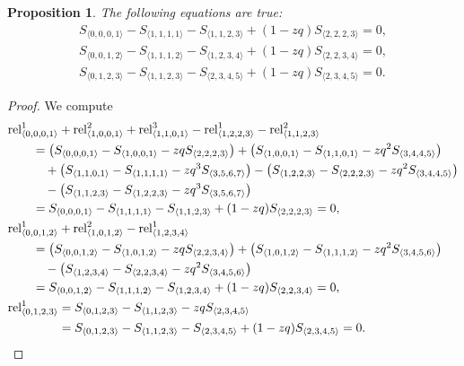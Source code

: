 \documentclass[10pt,a4paper]{amsart}
\numberwithin{equation}{section}
\newtheorem{Proposition}[Theorem]{Proposition}
\theoremstyle{definition}
\newcommand{\rel}{\text{rel}}
\begin{document}
\begin{Proposition}
The following equations are true:
\begin{gather*}
 S_{\langle 0, 0, 0, 1\rangle}- S_{\langle 1, 1, 1, 1\rangle} - S_{\langle 1, 1, 2, 3\rangle} + (1-zq)S_{\langle 2, 2, 2, 3\rangle} =0, \\
 S_{\langle 0, 0, 1,2\rangle}- S_{\langle 1, 1, 1, 2\rangle} - S_{\langle 1, 2,3,4\rangle} + (1-zq)S_{\langle 2, 2, 3, 4\rangle} =0, \\
 S_{\langle 0, 1,2,3\rangle}- S_{\langle 1,1,2,3\rangle} - S_{\langle 2,3,4,5\rangle} + (1-zq)S_{\langle 2, 3,4,5\rangle} =0.
\end{gather*}
\end{Proposition}

\begin{proof}
We compute
\begin{align*}
&\rel^1_{\langle0,0,0,1\rangle}+\rel^2_{\langle 1,0,0,1\rangle}+\rel^3_{\langle 1,1,0,1\rangle}
-\rel^1_{\langle 1,2,2,3\rangle }-\rel^2_{\langle 1,1,2,3\rangle} \\
& \qquad {}=\bigl(S_{\langle 0, 0, 0, 1\rangle} - S_{\langle 1, 0, 0, 1\rangle} -zq S_{\langle 2, 2, 2, 3\rangle}\bigr) + \bigl(S_{\langle 1, 0, 0, 1\rangle} - S_{\langle 1, 1, 0, 1\rangle} -zq^2 S_{\langle 3, 4, 4, 5\rangle}\bigr) \\
& \qquad\quad{} +\bigl( S_{\langle 1, 1, 0, 1\rangle} - S_{\langle 1, 1, 1, 1\rangle} -zq^3 S_{\langle 3, 5, 6, 7\rangle}\bigr) -\bigl(S_{\langle 1, 2, 2, 3\rangle} - S_{\langle 2, 2, 2, 3\rangle}-zq^2 S_{\langle 3, 4, 4, 5\rangle}\bigr) \\
& \qquad \quad{} -\bigl(S_{\langle 1, 1, 2, 3\rangle} - S_{\langle 1, 2, 2, 3\rangle}-zq^3 S_{\langle 3, 5, 6, 7\rangle}\bigr) \\
&\qquad =S_{\langle 0, 0, 0, 1\rangle}- S_{\langle 1, 1, 1, 1\rangle} - S_{\langle 1, 1, 2, 3\rangle} + (1-zq)S_{\langle 2, 2, 2, 3\rangle} =0,
\\
&\rel^1_{\langle0,0,1,2\rangle}+\rel^2_{\langle 1,0,1,2\rangle}-\rel^1_{\langle 1,2,3,4\rangle}\\
&\qquad =\bigl(S_{\langle 0, 0, 1, 2\rangle} - S_{\langle 1, 0, 1, 2\rangle} -zq S_{\langle 2, 2, 3, 4\rangle}\bigr) + \bigl(S_{\langle 1, 0, 1, 2\rangle} - S_{\langle 1, 1, 1, 2\rangle} -zq^2 S_{\langle 3, 4, 5, 6\rangle}\bigr) \\
& \qquad\quad{} -\bigl(S_{\langle 1, 2, 3, 4\rangle} - S_{\langle 2, 2, 3, 4\rangle}-zq^2 S_{\langle 3, 4, 5, 6\rangle}\bigr) \\
& \qquad =S_{\langle 0, 0, 1, 2\rangle}- S_{\langle 1, 1, 1, 2\rangle} - S_{\langle 1, 2,3,4\rangle} + (1-zq)S_{\langle 2, 2, 3,4\rangle} =0,
\\
&\rel^1_{\langle0,1,2,3\rangle} =S_{\langle 0, 1, 2,3\rangle} - S_{\langle 1, 1,2,3\rangle} -zq S_{\langle 2, 3, 4, 5\rangle} \\
&\hphantom{\rel^1_{\langle0,1,2,3\rangle}} {}=S_{\langle 0, 1,2,3\rangle}- S_{\langle 1,1,2,3\rangle} - S_{\langle 2,3,4,5\rangle} + (1-zq)S_{\langle 2, 3,4,5\rangle} =0. \tag*{\qed}
\end{align*}
\renewcommand{\qed}{}
\end{proof}
\end{document}
